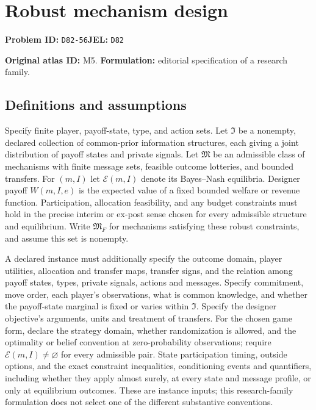 \documentclass[11pt,a4paper]{article}
\begin{document}
\section*{Robust mechanism design}
\textbf{Problem ID:} \texttt{D82-56}\quad \textbf{JEL:} \texttt{D82}\par
\label{problem:OP-0005}
\label{atlas:prob:M5}

\noindent\textbf{Original atlas ID:} M5. \textbf{Formulation:} editorial specification of a research family.

\subsection*{Definitions and assumptions}

Specify finite player, payoff-state, type, and action sets. Let $\mathfrak I$ be a nonempty, declared collection of common-prior information structures, each giving a joint distribution of payoff states and private signals. Let $\mathfrak M$ be an admissible class of mechanisms with finite message sets, feasible outcome lotteries, and bounded transfers. For $(m,I)$ let $\mathcal E(m,I)$ denote its Bayes--Nash equilibria. Designer payoff $W(m,I,e)$ is the expected value of a fixed bounded welfare or revenue function. Participation, allocation feasibility, and any budget constraints must hold in the precise interim or ex-post sense chosen for every admissible structure and equilibrium. Write $\mathfrak M_F$ for mechanisms satisfying these robust constraints, and assume this set is nonempty.

A declared instance must additionally specify the outcome domain, player utilities, allocation and transfer maps, transfer signs, and the relation among payoff states, types, private signals, actions and messages. Specify commitment, move order, each player's observations, what is common knowledge, and whether the payoff-state marginal is fixed or varies within $\mathfrak I$. Specify the designer objective's arguments, units and treatment of transfers. For the chosen game form, declare the strategy domain, whether randomization is allowed, and the optimality or belief convention at zero-probability observations; require $\mathcal E(m,I)\ne\varnothing$ for every admissible pair. State participation timing, outside options, and the exact constraint inequalities, conditioning events and quantifiers, including whether they apply almost surely, at every state and message profile, or only at equilibrium outcomes. These are instance inputs; this research-family formulation does not select one of the different substantive conventions.
\end{document}
